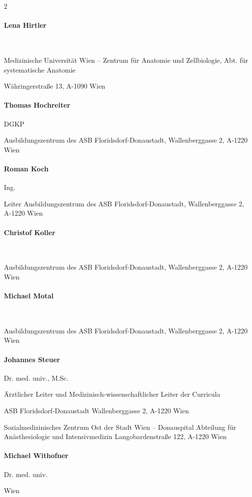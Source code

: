 \documentclass[ngerman,a4paper,fontsize=9pt,BCOR=1.5cm,headings=big,draft=no]{scrbook}
\begin{document}
\begin{multicols}{2}
    \paragraph{Lena Hirtler}~

    Medizinische Universität Wien -- Zentrum f\"ur Anatomie und
    Zellbiologie, Abt. f\"ur systematische Anatomie
    
    Währingerstra{\ss}e 13, A-1090 Wien
    
    \paragraph{Thomas Hochreiter}
    DGKP
    
    Ausbildungszentrum des ASB Floridsdorf-Donaustadt,    
    Wallenberggasse 2, A-1220 Wien
    
    \paragraph{Roman Koch} 
    Ing.
    
    Leiter Ausbildungszentrum des ASB
    Floridsdorf-Donaustadt, Wallenberggasse 2, A-1220 Wien
    
    \paragraph{Christof Koller}~
    
    Ausbildungszentrum des ASB Floridsdorf-Donaustadt,
    Wallenberggasse 2, A-1220 Wien\\
    
    \paragraph{Michael Motal}~
    
    Ausbildungszentrum des ASB Floridsdorf-Donaustadt,
    Wallenberggasse 2, A-1220 Wien\\
    
    \paragraph{Johannes Steuer}
    Dr. med. univ., M.Sc.
    
    \"Arztlicher Leiter und Medizinisch-wissenschaftlicher Leiter der
    Curricula
    
    ASB Floridsdorf-Donaustadt
    Wallenberggasse 2, A-1220 Wien
    
    Sozialmedizinisches Zentrum Ost der Stadt Wien -- Donauspital
    Abteilung f\"ur Anästhesiologie und Intensivmedizin
    Langobardenstra{\ss}e 122, A-1220 Wien
    
    \paragraph{Michael Withofner}
    Dr. med. univ.
    
    Wien
    
\end{multicols}
\end{document}
